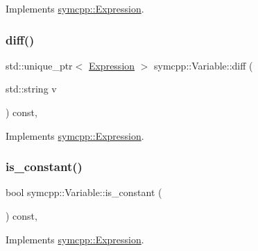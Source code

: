 Implements \mbox{\hyperlink{classsymcpp_1_1Expression_a2e7de5a295ccf0efdc9b34cea7ba3d0b}{symcpp\+::\+Expression}}.

\mbox{\label{classsymcpp_1_1Variable_ae17a02824954066f4e8b1ed6ba799ff0}} 
\subsubsection{\texorpdfstring{diff()}{diff()}}
{\footnotesize\ttfamily std\+::unique\+\_\+ptr$<$ \mbox{\hyperlink{classsymcpp_1_1Expression}{Expression}} $>$ symcpp\+::\+Variable\+::diff (\begin{DoxyParamCaption}\item[{std\+::string}]{v }\end{DoxyParamCaption}) const\hspace{0.3cm}{\ttfamily [override]}, {\ttfamily [virtual]}}



Implements \mbox{\hyperlink{classsymcpp_1_1Expression_a032fe8da79d5e231ca2d21a201c8f32d}{symcpp\+::\+Expression}}.

\mbox{\label{classsymcpp_1_1Variable_a1ccd5094922661828039f16b77974fe0}} 
\subsubsection{\texorpdfstring{is\_constant()}{is\_constant()}}
{\footnotesize\ttfamily bool symcpp\+::\+Variable\+::is\+\_\+constant (\begin{DoxyParamCaption}{ }\end{DoxyParamCaption}) const\hspace{0.3cm}{\ttfamily [override]}, {\ttfamily [virtual]}}



Implements \mbox{\hyperlink{classsymcpp_1_1Expression_a30db7917c8948e22330cbe8259caeae2}{symcpp\+::\+Expression}}.

\mbox{\label{classsymcpp_1_1Variable_a4b998019a17f29482772f1f945398ff3}} 

